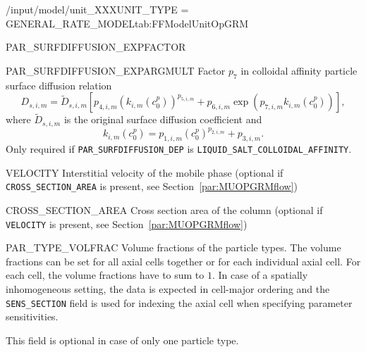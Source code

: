 \begin{condsubgroup}{/input/model/unit\_XXX}{UNIT\_TYPE = GENERAL\_RATE\_MODEL}{tab:FFModelUnitOpGRM}
\begin{dataset}[unit=--,type=double,range={$\mathds{R}$},length={\texttt{NBND}}]{PAR\_SURFDIFFUSION\_EXPFACTOR}
  \end{dataset}
  \begin{dataset}[unit=--,type=double,range={$\mathds{R}$},length={\texttt{NBND}}]{PAR\_SURFDIFFUSION\_EXPARGMULT}
    Factor $p_7$ in colloidal affinity particle surface diffusion relation
    \begin{equation*}
      D_{s,i,m} = \tilde{D}_{s,i,m} \left[ p_{4,i,m} \left(k_{i,m}\left(c^p_0\right)\right)^{p_{5,i,m}} + p_{6,i,m} \exp\left( p_{7,i,m} k_{i,m}\left( c^p_0 \right) \right) \right],
    \end{equation*}
    where $\tilde{D}_{s,i,m}$ is the original surface diffusion coefficient and
    \begin{equation*}
      k_{i,m}( c^p_0 ) = p_{1,i,m} \left(c^p_0\right)^{p_{2,i,m}} + p_{3,i,m}.
    \end{equation*}
    Only required if \texttt{PAR\_SURFDIFFUSION\_DEP} is \texttt{LIQUID\_SALT\_COLLOIDAL\_AFFINITY}.
  \end{dataset}
  \begin{dataset}[unit=\si{\metre\per\second},type=double,range={$\mathds{R}$},length={$1$ / \texttt{NSEC}}]{VELOCITY}
    Interstitial velocity of the mobile phase (optional if \texttt{CROSS\_SECTION\_AREA} is present, see Section~\ref{par:MUOPGRMflow})
  \end{dataset}
  \begin{dataset}[unit=\si{\square\metre},type=double,range={$>0$},length={1}]{CROSS\_SECTION\_AREA}
    Cross section area of the column (optional if \texttt{VELOCITY} is present, see Section~\ref{par:MUOPGRMflow})
  \end{dataset}
  \begin{dataset}[unit=--,type=double,range={$[0,1]$},length={\texttt{NPARTYPE} / $\texttt{NCOL} \cdot \texttt{NPARTYPE}$}]{PAR\_TYPE\_VOLFRAC}
    Volume fractions of the particle types.
    The volume fractions can be set for all axial cells together or for each individual axial cell.
    For each cell, the volume fractions have to sum to $1$.
    In case of a spatially inhomogeneous setting, the data is expected in cell-major ordering and the \texttt{SENS\_SECTION} field is used for indexing the axial cell when specifying parameter sensitivities.

    This field is optional in case of only one particle type.
  \end{dataset}
\end{condsubgroup}

